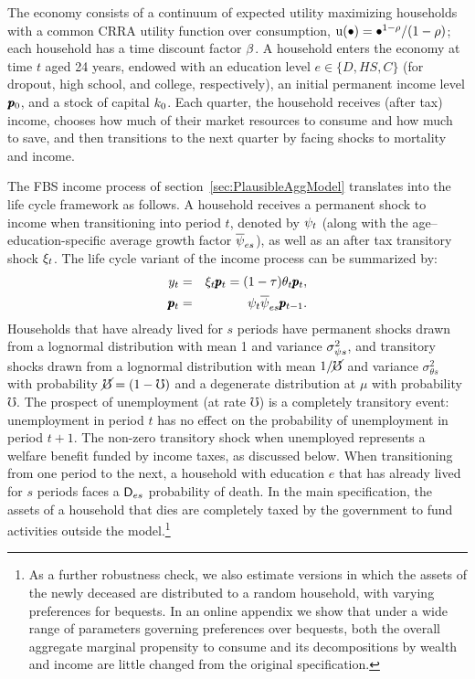 \documentclass[12pt,titlepage]{econtex}
\renewcommand{\urate}{\ensuremath{\mho}}
\renewcommand{\erate}{\ensuremath{\cancel{\urate}}}
\begin{document}
The economy consists of a continuum of expected utility maximizing households with a common CRRA utility function over consumption, ${\mathrm{u}}(\bullet) = \bullet^{1-\rho}/(1-\rho)$; each household has a time discount factor $\beta$.  A household enters the economy at time $t$ aged 24 years, endowed with an education level $e \in \{D,HS,C\}$ (for dropout, high school, and college, respectively), an initial permanent income level $\pmb{p}_0$, and a stock of capital $k_0$.  Each quarter, the household receives (after tax) income, chooses how much of their market resources to consume and how much to save, and then transitions to the next quarter by facing shocks to mortality and income.

The FBS income process of section~\ref{sec:PlausibleAggModel} translates into the life cycle framework as follows. A household receives a permanent shock to income when transitioning into period $t$, denoted by $\psi_t$ (along with the age--education-specific average growth factor $\overline{\psi}_{es}$), as well as an after tax transitory shock $\xi_t$.  The life cycle variant of the income process can be summarized by:
\begin{eqnarray*}
  y_t &=& \xi_t \pmb{p}_t = (1 - \tau)\theta_t \pmb{p}_t,\\
  \pmb{p}_t &=& \psi_t \overline{\psi}_{es} \pmb{p}_{t-1}.
\end{eqnarray*}
Households that have already lived for $s$ periods have permanent shocks drawn from a lognormal distribution with mean 1 and variance $\sigma^2_{\psi s}$, and transitory shocks drawn from a lognormal distribution with mean $1/\erate$ and variance $\sigma^2_{\theta s}$ with probability $\erate = (1 - \urate)$ and a degenerate distribution at $\mu$ with probability $\urate$.  The prospect of unemployment (at rate $\urate$) is a completely transitory event: unemployment in period $t$ has no effect on the probability of unemployment in period $t + 1$.  The non-zero transitory shock when unemployed represents a welfare benefit funded by income taxes, as discussed below.  When transitioning from one period to the next, a household with education $e$ that has already lived for $s$ periods faces a $\mathsf{D}_{es}$ probability of death.  In the main specification, the assets of a household that dies are completely taxed by the government to fund activities outside the model.\footnote{As a further robustness check, we also estimate versions in which the assets of the newly deceased are distributed to a random household, with varying preferences for bequests. In an online appendix we show that under a wide range of parameters governing preferences over bequests, both the overall aggregate marginal propensity to consume and its decompositions by wealth and income are little changed from the original specification.
}
\end{document}
